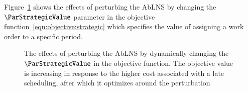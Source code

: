Figure~\ref{fig:responses:value_change} shows the effects of
perturbing the AbLNS by changing the $\ParStrategicValue$ parameter in the objective
function~\ref{eqn:objective:strategic} which specifies the value of assigning a
work order to a specific period.

\begin{figure}[H]%
	\centering
	\resizebox{\linewidth}{!}{
		
	}
	\caption{The effects of perturbing the AbLNS by dynamically changing the
	$\ParStrategicValue$ in the objective function. The objective value
	is increasing in response to the higher cost associated with a late
	scheduling, after which it optimizes around the perturbation}
	\label{fig:responses:value_change}
\end{figure}
 
